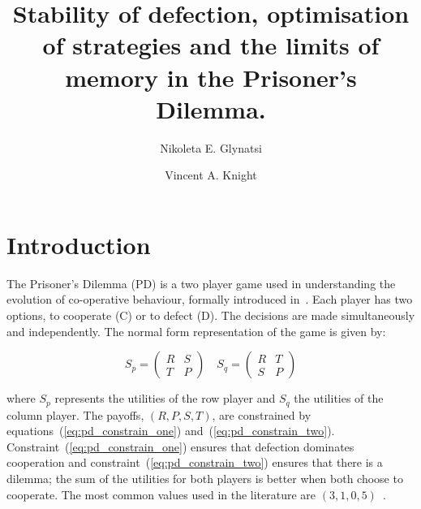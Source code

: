 \documentclass[10pt]{article}
\title{Stability of defection, optimisation of strategies and the limits of
       memory in the Prisoner's Dilemma.}
\author{Nikoleta E. Glynatsi \and Vincent A. Knight}
\date{}
\begin{document}
\maketitle

\begin{abstract}
\end{abstract}

\section{Introduction}\label{section:introduction}

The Prisoner's Dilemma (PD) is a two player game used in understanding the
evolution of co-operative behaviour, formally introduced in~\cite{Flood1958}.
Each player has two options, to cooperate (C) or to defect (D). The decisions
are made simultaneously and independently. The normal form representation of the
game is given by:

\begin{equation}\label{equ:pd_definition}
    S_p =
    \begin{pmatrix}
        R & S  \\
        T & P
    \end{pmatrix}
    \quad
    S_q =
    \begin{pmatrix}
        R & T  \\
        S & P
    \end{pmatrix}
\end{equation}

where \(S_p\) represents the utilities of the row player and \(S_q\) the
utilities of the column player. The payoffs, \((R, P, S, T)\), are constrained
by equations~(\ref{eq:pd_constrain_one}) and~(\ref{eq:pd_constrain_two}).
Constraint~(\ref{eq:pd_constrain_one}) ensures that
defection dominates cooperation and constraint~(\ref{eq:pd_constrain_two})
ensures that there is a dilemma; the sum of the utilities for both players is
better when both choose to cooperate. The most common values used in the literature are
\((3, 1, 0, 5)\)~\cite{Axelrod1981}.
\end{document}
